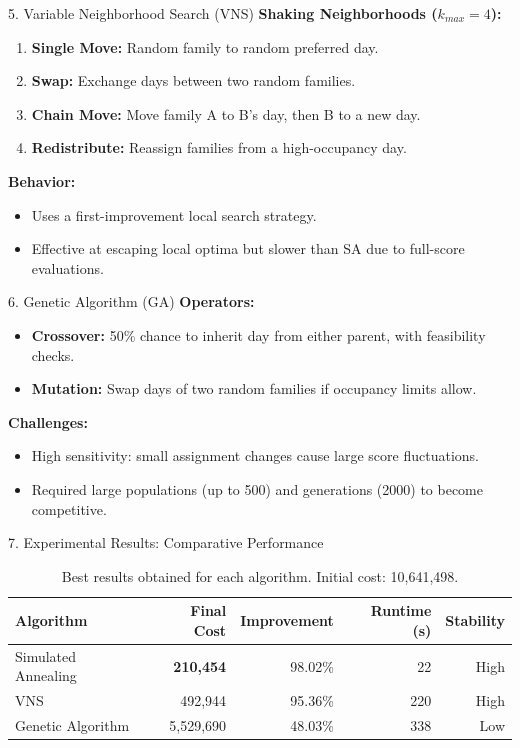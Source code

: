\documentclass[aspectratio=169]{beamer}
\begin{document}
\begin{frame}{5. Variable Neighborhood Search (VNS)}
\textbf{Shaking Neighborhoods ($k_{max}=4$):}
\begin{enumerate}
    \item \textbf{Single Move:} Random family to random preferred day.
    \item \textbf{Swap:} Exchange days between two random families.
    \item \textbf{Chain Move:} Move family A to B's day, then B to a new day.
    \item \textbf{Redistribute:} Reassign families from a high-occupancy day.
\end{enumerate}

\textbf{Behavior:}
\begin{itemize}
    \item Uses a first-improvement local search strategy.
    \item Effective at escaping local optima but slower than SA due to full-score evaluations.
\end{itemize}
\end{frame}

\begin{frame}{6. Genetic Algorithm (GA)}
\textbf{Operators:}
\begin{itemize}
    \item \textbf{Crossover:} 50\% chance to inherit day from either parent, with feasibility checks.
    \item \textbf{Mutation:} Swap days of two random families if occupancy limits allow.
\end{itemize}

\textbf{Challenges:}
\begin{itemize}
    \item High sensitivity: small assignment changes cause large score fluctuations.
    \item Required large populations (up to 500) and generations (2000) to become competitive.
\end{itemize}
\end{frame}

\begin{frame}{7. Experimental Results: Comparative Performance}
\begin{table}[]
\centering
\small
\begin{tabular}{@{}lrrrr@{}}
\toprule
\textbf{Algorithm} & \textbf{Final Cost} & \textbf{Improvement} & \textbf{Runtime (s)} & \textbf{Stability} \\ \midrule
Simulated Annealing & \textbf{210,454} & 98.02\% & 22 & High \\
VNS & 492,944 & 95.36\% & 220 & High \\
Genetic Algorithm & 5,529,690 & 48.03\% & 338 & Low \\ \bottomrule
\end{tabular}
\caption{Best results obtained for each algorithm. Initial cost: 10,641,498.}
\end{table}
\end{frame}
\end{document}
